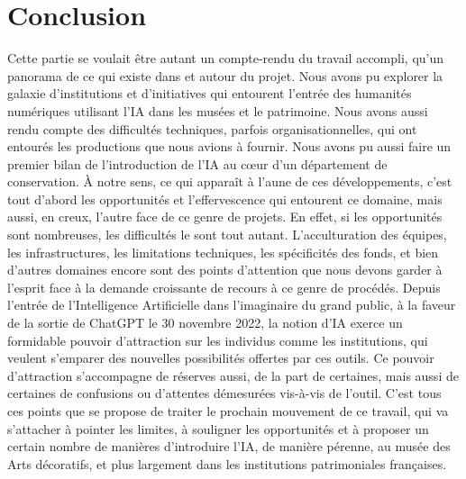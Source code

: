 \chapter*{Conclusion}

Cette partie se voulait être autant un compte-rendu du travail accompli, qu'un panorama de ce qui existe dans et autour du projet. Nous avons pu explorer la galaxie d'institutions et d'initiatives qui entourent l'entrée des humanités numériques utilisant l'IA dans les musées et le patrimoine. Nous avons aussi rendu compte des difficultés techniques, parfois organisationnelles, qui ont entourés les productions que nous avions à fournir. Nous avons pu aussi faire un premier bilan de l'introduction de l'IA au cœur d'un département de conservation. À notre sens, ce qui apparaît à l'aune de ces développements, c'est tout d'abord les opportunités et l'effervescence qui entourent ce domaine, mais aussi, en creux, l'autre face de ce genre de projets. En effet, si les opportunités sont nombreuses, les difficultés le sont tout autant. L'acculturation des équipes, les infrastructures, les limitations techniques, les spécificités des fonds, et bien d'autres domaines encore sont des points d'attention que nous devons garder à l'esprit face à la demande croissante de recours à ce genre de procédés. Depuis l'entrée de l'Intelligence Artificielle dans l'imaginaire du grand public, à la faveur de la sortie de ChatGPT le 30 novembre 2022, la notion d'IA exerce un formidable pouvoir d'attraction sur les individus comme les institutions, qui veulent s'emparer des nouvelles possibilités offertes par ces outils. Ce pouvoir d'attraction s'accompagne de réserves aussi, de la part de certain\wokisme e\wokisme s, mais aussi de certaines de confusions ou d'attentes démesurées vis-à-vis de l'outil. C'est tous ces points que se propose de traiter le prochain mouvement de ce travail, qui va s'attacher à pointer les limites, à souligner les opportunités et à proposer un certain nombre de manières d'introduire l'IA, de manière pérenne, au musée des Arts décoratifs, et plus largement dans les institutions patrimoniales françaises.
